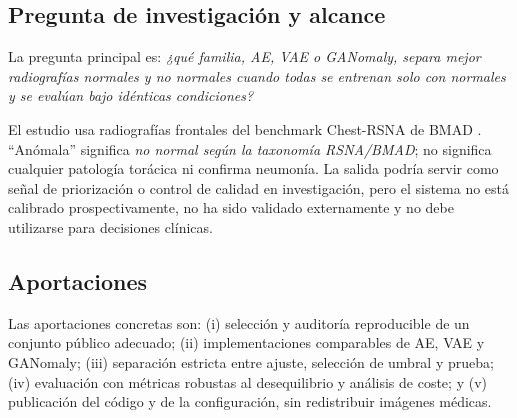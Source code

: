 \subsection{Pregunta de investigación y alcance}

La pregunta principal es: \emph{¿qué familia, AE, VAE o GANomaly, separa mejor
radiografías normales y no normales cuando todas se entrenan solo con normales
y se evalúan bajo idénticas condiciones?}

El estudio usa radiografías frontales del benchmark Chest-RSNA de BMAD
\cite{bao2024bmad,shih2019rsna}. ``Anómala'' significa \emph{no normal según la
taxonomía RSNA/BMAD}; no significa cualquier patología torácica ni confirma
neumonía. La salida podría servir como señal de priorización o control de
calidad en investigación, pero el sistema no está calibrado prospectivamente,
no ha sido validado externamente y no debe utilizarse para decisiones clínicas.

\subsection{Aportaciones}

Las aportaciones concretas son: (i) selección y auditoría reproducible de un
conjunto público adecuado; (ii) implementaciones comparables de AE, VAE y
GANomaly; (iii) separación estricta entre ajuste, selección de umbral y prueba;
(iv) evaluación con métricas robustas al desequilibrio y análisis de coste; y
(v) publicación del código y de la configuración, sin redistribuir imágenes
médicas.
